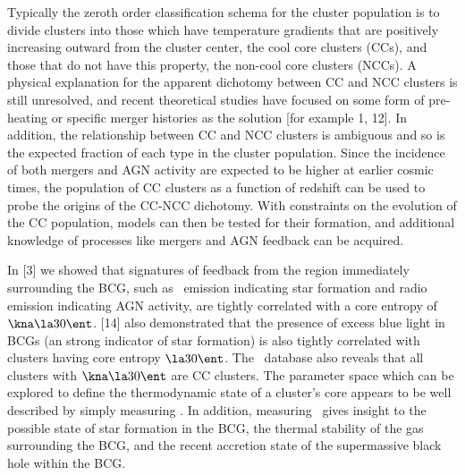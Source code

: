 \large
\begin{center}
\end{center}
\normalsize
Typically the zeroth order classification schema for the cluster
population is to divide clusters into those which have temperature
gradients that are positively increasing outward from the cluster
center, the cool core clusters (CCs), and those that do not have this
property, the non-cool core clusters (NCCs). A physical explanation
for the apparent dichotomy between CC and NCC clusters is still
unresolved, and recent theoretical studies have focused on some form
of pre-heating or specific merger histories as the solution [for
  example 1, 12]. In addition, the relationship between CC and NCC
clusters is ambiguous and so is the expected fraction of each type in
the cluster population. Since the incidence of both mergers and AGN
activity are expected to be higher at earlier cosmic times, the
population of CC clusters as a function of redshift can be used to
probe the origins of the CC-NCC dichotomy. With constraints on the
evolution of the CC population, models can then be tested for their
formation, and additional knowledge of processes like mergers and AGN
feedback can be acquired.

In [3] we showed that signatures of feedback from the region
immediately surrounding the BCG, such as \halpha\ emission indicating
star formation and radio emission indicating AGN activity, are tightly
correlated with a core entropy of $\kna \la 30 \ent$. [14] also
demonstrated that the presence of excess blue light in BCGs (an strong
indicator of star formation) is also tightly correlated with clusters
having core entropy $\la 30 \ent$. The \accept\ database also reveals
that all clusters with $\kna \la 30 \ent$ are CC clusters. The
parameter space which can be explored to define the thermodynamic
state of a cluster's core appears to be well described by simply
measuring \kna. In addition, measuring \kna\ gives insight to the
possible state of star formation in the BCG, the thermal stability of
the gas surrounding the BCG, and the recent accretion state of the
supermassive black hole within the BCG.

